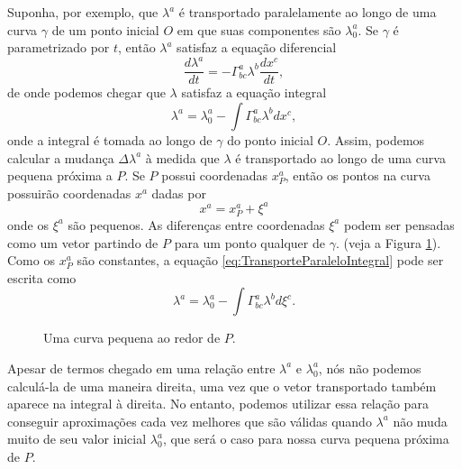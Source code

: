 Suponha, por exemplo, que $\lambda^a$ é transportado paralelamente ao longo de uma curva $\gamma$ de um ponto inicial $O$ em que suas componentes são $\lambda_0^a$. Se $\gamma$ é parametrizado por $t$, então $\lambda^a$ satisfaz a equação diferencial
\begin{equation}\label{eq:TransporteParaleloDiferencial}
	\frac{d\lambda^a}{dt} = -\Gamma^a_{bc}\lambda^b\frac{dx^c}{dt},
\end{equation}
de onde podemos chegar que $\lambda$ satisfaz a equação integral
\begin{equation}\label{eq:TransporteParaleloIntegral}
	\lambda^a = \lambda^a_0 - \int\Gamma^a_{bc}\lambda^b dx^c,
\end{equation}
onde a integral é tomada ao longo de $\gamma$ do ponto inicial $O$. Assim, podemos calcular a mudança $\Delta\lambda^a$ à medida que $\lambda$ é transportado ao longo de uma curva pequena próxima a $P$. Se $P$ possui coordenadas $x^a_P$, então os pontos na curva possuirão coordenadas $x^a$ dadas por
\[
	x^a=x^a_P+\xi^a
\]
onde os $\xi^a$ são pequenos. As diferenças entre coordenadas $\xi^a$ podem ser pensadas como um vetor partindo de $P$ para um ponto qualquer de $\gamma$. (veja a Figura \ref{fig:SmallLoop}). Como os $x^a_P$ são constantes, a equação \ref{eq:TransporteParaleloIntegral} pode ser escrita como
\begin{equation}\label{eq:TransporteParaleloIntegralXi}
	\lambda^a=\lambda^a_0 - \int\Gamma^a_{bc}\lambda^b d\xi^c .
\end{equation}

\begin{figure}[t]
	\centering
	\caption{Uma curva pequena ao redor de $P$.}
	\label{fig:SmallLoop}
\end{figure}

Apesar de termos chegado em uma relação entre $\lambda^a$ e $\lambda^a_0$, nós não podemos calculá-la de uma maneira direita, uma vez que o vetor transportado também aparece na integral à direita. No entanto, podemos utilizar essa relação para conseguir aproximações cada vez melhores que são válidas quando $\lambda^a$ não muda muito de seu valor inicial $\lambda^a_0$, que será o caso para nossa curva pequena próxima de $P$.

